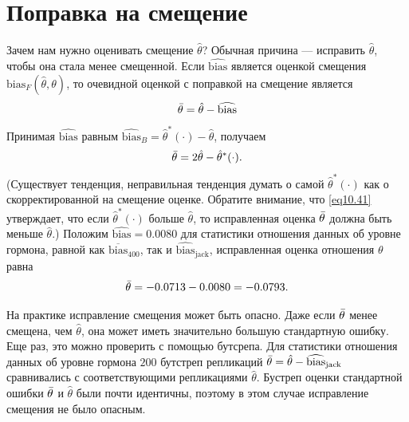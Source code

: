 \section{Поправка на смещение}

Зачем нам нужно оценивать смещение $\hat{\theta}$? Обычная причина --- исправить $\hat{\theta}$, чтобы она стала менее смещенной. Если $\widehat{\text{bias}}$ является оценкой смещения $\text{bias}_{F}(\hat{\theta}, \theta)$, то очевидной оценкой с поправкой на смещение является
\begin{equation}\label{eq10.40}
    \Bar{\theta} = \hat{\theta} - \widehat{\text{bias}}
\end{equation}
Принимая $\widehat{\text{bias}}$ равным $\widehat{\text{bias}}_{B} = \hat{\theta}^{*}(\cdot) - \hat{\theta}$, получаем
\begin{equation}\label{eq10.41}
    \Bar{\theta} = 2\hat{\theta} - \hat{\theta}^{*}(\cdot).
\end{equation}
(Существует тенденция, неправильная тенденция думать о самой $\hat{\theta}^{*}(\cdot)$ как о скорректированной на смещение оценке. Обратите внимание, что \ref{eq10.41} утверждает, что если $\hat{\theta}^{*}(\cdot)$ больше $\hat{\theta}$, то исправленная оценка $\Bar{\theta}$ должна быть меньше $\hat{\theta}$.) Положим $\widehat{\text{bias}} = 0.0080$ для статистики отношения данных об уровне гормона, равной как $\overline{\text{bias}}_{400}$, так и $\widehat{\text{bias}}_{\text{jack}}$, исправленная оценка отношения $\theta$ равна
\begin{equation}\label{eq10.42}
    \Bar{\theta} = -0.0713 - 0.0080 = -0.0793. 
\end{equation}

На практике исправление смещения может быть опасно. Даже если $\Bar{\theta}$ менее смещена, чем $\hat{\theta}$, она может иметь значительно большую стандартную ошибку. Еще раз, это можно проверить с помощью бутсрепа. Для статистики отношения данных об уровне гормона $200$ бутстреп репликаций $\Bar{\theta} = \hat{\theta} - \widehat{\text{bias}}_{\text{jack}}$ сравнивались с соответствующими репликациями $\hat{\theta}$. Бустреп оценки стандартной ошибки $\Bar{\theta}$ и $\hat{\theta}$ были почти идентичны, поэтому в этом случае исправление смещения не было опасным.

